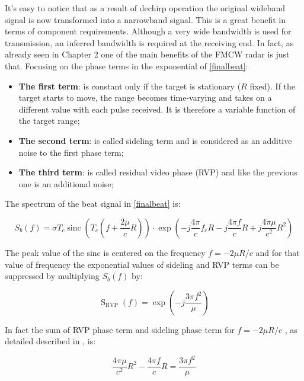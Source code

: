 It's easy to notice that as a result of dechirp operation the original wideband signal is now transformed into a narrowband signal. This is a great benefit in terms of component requirements. Although a very wide bandwidth is used for transmission, an inferred bandwidth is required at the receiving end. In fact, as already seen in Chapter 2 one of the main benefits of the FMCW radar is just that.
Focusing on the phase terms in the exponential of \ref{finalbeat}:


\begin{itemize}
     \item \textbf{The first term}: is constant only if the target is stationary ($R$ fixed). If the target starts to move, the range becomes time-varying and takes on a different value with each pulse received. It is therefore a variable function of the target range;
         
    \item \textbf{The second term}: is called sideling term and is considered as an additive noise to the first phase term;
    
    \item \textbf{The third term}: is called residual video phase (RVP) and like the previous one is an additional noise;
\end{itemize}

The spectrum of the beat signal in \ref{finalbeat} is:


\begin{equation}
S_{b}(f)=\sigma T_{c} \operatorname{sinc}\left(T_{c}\left(f+\frac{2 \mu}{c} R\right)\right) \cdot \exp \left(-j \frac{4 \pi}{c} f_{c} R -j \frac{4 \pi f}{c} R+j \frac{4 \pi \mu}{c^{2}} R^{2}\right)
\end{equation}

The peak value of the sinc is centered on the frequency $
f=-2 \mu R / c
$
and for that value of frequency the exponential values of sideling and RVP terms can be suppressed by multiplying $S_{b}(f)$ by:

\begin{equation}
\operatorname{S}_{\mathrm{RVP}}(f)=\exp \left(-j \frac{3 \pi f^{2}}{\mu}\right)
\end{equation}

In fact the sum of RVP phase term and sideling phase term for $
f=-2 \mu R / c
$
, as detailed described in \cite{chen_chinese}, is:

\begin{equation}
\frac{4 \pi \mu}{c^{2}} R^{2}-\frac{4 \pi f}{c} R=\frac{3 \pi f^{2}}{\mu}
\end{equation}

